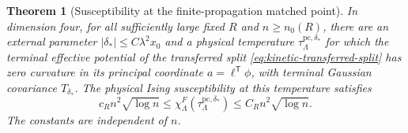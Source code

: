 \documentclass[11pt]{article}
\newtheorem{theorem}{Theorem}[section]
\theoremstyle{definition}
\begin{document}
\begin{theorem}[Susceptibility at the finite-propagation matched point]
\label{thm:d4-finite-propagation}
In dimension four, for all sufficiently large fixed \(R\)
and \(n\ge n_0(R)\), there are an external parameter
\(|\delta_*|\le C\lambda^2x_0\) and a physical temperature
\(\tau_{\Lambda}^{\mathrm{pc},\delta_*}\) for which the
terminal effective potential of the transferred split
\eqref{eq:kinetic-transferred-split} has zero curvature in its
principal coordinate \(a=\ell^{\mathsf T}\phi\), with terminal
Gaussian covariance \(T_{\delta_*}\). The physical Ising susceptibility
at this temperature satisfies
\begin{equation}
 c_R n^2\sqrt{\log n}
 \le \chi_\Lambda^F(\tau_{\Lambda}^{\mathrm{pc},\delta_*})
 \le C_R n^2\sqrt{\log n}.
\end{equation}
The constants are independent of \(n\).
\end{theorem}
\end{document}

